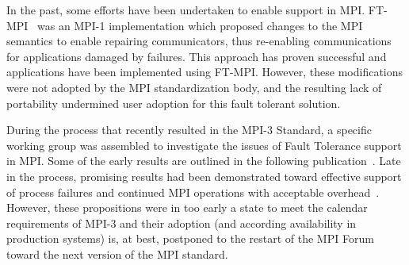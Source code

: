 

In the past, some efforts have been undertaken to enable \abft support in MPI. 
FT-MPI~\cite{fagg2000ft} was an MPI-1 implementation which proposed
changes to the MPI semantics to enable repairing communicators, thus
re-enabling communications for applications damaged by failures. This
approach has proven successful and applications have been
implemented using FT-MPI. However, these modifications were not adopted by
the MPI standardization body, and the resulting lack of portability
undermined user adoption for this fault tolerant solution.




During the process that recently resulted in the MPI-3 Standard, a specific
working group was assembled to investigate the issues of Fault Tolerance support
in MPI. Some of the early results are outlined in the following
publication~\cite{Hursey11MPI3FT}. Late in the process, promising results had
been demonstrated toward effective support of process failures and continued MPI
operations with acceptable overhead~\cite{DBLP:conf/pvm/BlandBHHBD12}. However,
these propositions were in too early a state to meet the calendar requirements
of MPI-3 and their adoption (and according availability in production systems)
is, at best, postponed to the restart of the MPI Forum toward the next version
of the MPI standard. 

